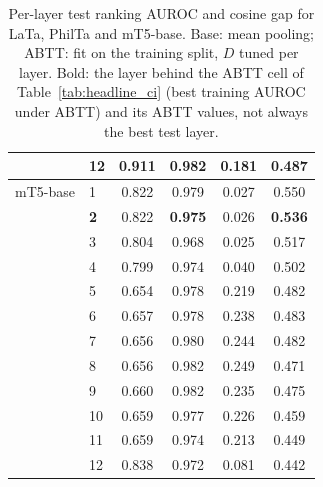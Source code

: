 \begin{table}[t]
\begin{tabular}{llcccc}
 & 12 & 0.911 & 0.982 & 0.181 & 0.487 \\
\midrule
mT5-base & 1 & 0.822 & 0.979 & 0.027 & 0.550 \\
 & \textbf{2} & 0.822 & \textbf{0.975} & 0.026 & \textbf{0.536} \\
 & 3 & 0.804 & 0.968 & 0.025 & 0.517 \\
 & 4 & 0.799 & 0.974 & 0.040 & 0.502 \\
 & 5 & 0.654 & 0.978 & 0.219 & 0.482 \\
 & 6 & 0.657 & 0.978 & 0.238 & 0.483 \\
 & 7 & 0.656 & 0.980 & 0.244 & 0.482 \\
 & 8 & 0.656 & 0.982 & 0.249 & 0.471 \\
 & 9 & 0.660 & 0.982 & 0.235 & 0.475 \\
 & 10 & 0.659 & 0.977 & 0.226 & 0.459 \\
 & 11 & 0.659 & 0.974 & 0.213 & 0.449 \\
 & 12 & 0.838 & 0.972 & 0.081 & 0.442 \\
\bottomrule
\end{tabular}
\caption{Per-layer test ranking AUROC and cosine gap for LaTa, PhilTa and mT5-base. Base: mean pooling; ABTT: fit on the training split, $D$ tuned per layer. Bold: the layer behind the ABTT cell of Table~\ref{tab:headline_ci} (best training AUROC under ABTT) and its ABTT values, not always the best test layer.}
\label{tab:taskA_main}
\end{table}
